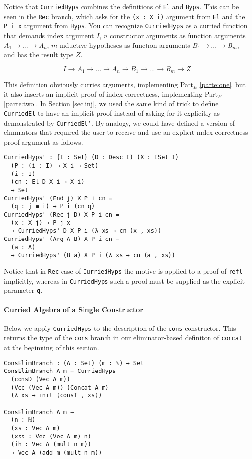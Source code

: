 \documentclass[preprint,nonatbib]{sigplanconf}
\newcommand{\refsec}[1]{Section \ref{sec:#1}}
\newcommand{\refparte}[1]{Part$_E$ \ref{parte:#1}}
\begin{document}
Notice that {\tt CurriedHyps} combines the
definitions of {\tt El} and {\tt Hyps}. This can be seen in the
{\tt Rec} branch, which asks for the {\tt (x : X i)} argument
from {\tt El} and the {\tt P i x} argument from {\tt Hyps}. You can
recognize {\tt CurriedHyps} as a curried function that demands
index argument $I$, $n$ constructor arguments as function arguments
$A_1 → ... → A_n$, $m$ inductive hypotheses as function arguments
$B_1 → ... → B_m$, and has the result type $Z$.

\[
I → A_1 → ... → A_n → B_1 → ... → B_m → Z
\]

This definition obviously curries arguments, implementing
\refparte{one}, but it also inserts an implicit proof of index
correctness, implementing \refparte{two}. In \refsec{inj}, we used
the same kind of trick to define {\tt CurriedEl} to have an implicit
proof instead of asking for it explicitly as demonstrated
by {\tt CurriedEl'}. By analogy, we could have defined a version of
eliminators that required the user to receive and use an explicit
index correctness proof argument as follows.

\begin{verbatim}
CurriedHyps' : {I : Set} (D : Desc I) (X : ISet I)
  (P : (i : I) → X i → Set)
  (i : I)
  (cn : El D X i → X i)
  → Set
CurriedHyps' (End j) X P i cn =
  (q : j ≡ i) → P i (cn q)
CurriedHyps' (Rec j D) X P i cn =
  (x : X j) → P j x
  → CurriedHyps' D X P i (λ xs → cn (x , xs))
CurriedHyps' (Arg A B) X P i cn =
  (a : A)
  → CurriedHyps' (B a) X P i (λ xs → cn (a , xs))
\end{verbatim}

Notice that in
{\tt Rec} case of {\tt CurriedHyps} the motive is applied to a proof
of {\tt refl} implicitly, whereas in {\tt CurriedHyps} such a proof
must be supplied as the explicit parameter {\tt q}.

\paragraph{Curried Algebra of a Single Constructor}

Below we apply {\tt CurriedHyps} to the description of the
{\tt cons} constructor. This returns the type of the {\tt cons} branch
in our eliminator-based definiton of {\tt concat} at the
beginning of this section.

\begin{verbatim}
ConsElimBranch : (A : Set) (m : ℕ) → Set
ConsElimBranch A m = CurriedHyps
  (consD (Vec A m))
  (Vec (Vec A m)) (Concat A m)
  (λ xs → init (consT , xs))

ConsElimBranch A m ⇝
  (n : ℕ)
  (xs : Vec A m)
  (xss : Vec (Vec A m) n)
  (ih : Vec A (mult n m))
  → Vec A (add m (mult n m))
\end{verbatim}
\end{document}

